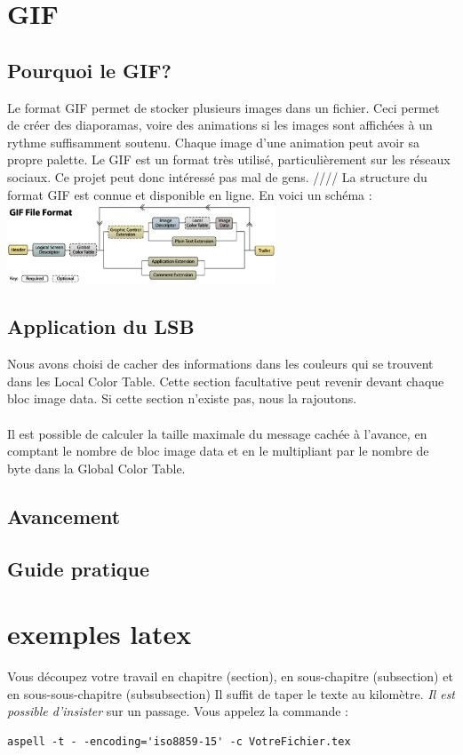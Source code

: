 \section {GIF}
\subsection {Pourquoi le GIF?}
Le format GIF permet de stocker plusieurs images dans un fichier. Ceci permet de créer des diaporamas, voire des animations si les images sont affichées à un rythme suffisamment soutenu. Chaque image d'une animation peut avoir sa propre palette.
Le GIF est un format très utilisé, particulièrement sur les réseaux sociaux. Ce projet peut donc intéressé pas mal de gens. ////
La structure du format GIF est connue et disponible en ligne. En voici un schéma : 
\includegraphics[width=8cm]{gif_structure.eps}
\subsection {Application du LSB}
Nous avons choisi de cacher des informations dans les couleurs qui se trouvent dans les Local Color Table. Cette section facultative peut revenir devant chaque bloc image data. Si cette section n'existe pas, nous la rajoutons.\\\\
Il est possible de calculer la taille maximale du message cachée à l'avance, en comptant le nombre de bloc image data et en le multipliant par le nombre de byte dans la Global Color Table.
\subsection {Avancement}
\subsection {Guide pratique}
\newpage
%
%
%
%
\section {exemples latex}
Vous découpez votre travail en chapitre (section), en sous-chapitre (subsection) et en sous-sous-chapitre (subsubsection)
Il suffit de taper le texte au kilomètre. \emph{Il est possible d'insister} sur un passage.
Vous appelez la commande :
\lstset{frame=trBL}
\begin{lstlisting}
aspell -t - -encoding='iso8859-15' -c VotreFichier.tex
\end{lstlisting}
